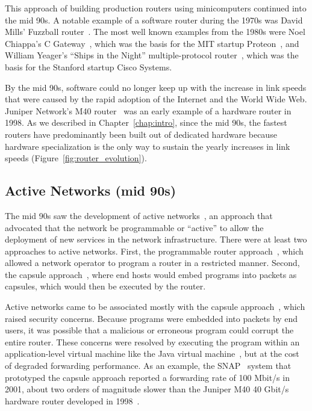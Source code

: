 This approach of building production routers using minicomputers continued into
the mid 90s.  A notable example of a software router during the 1970s was David
Mills' Fuzzball router~\cite{fuzzball}. The most well known examples from the
1980s were Noel Chiappa's C Gateway~\cite{cgw}, which was the basis for the MIT
startup Proteon~\cite{proteon}, and William Yeager's ``Ships in the Night''
multiple-protocol router~\cite{ships}, which was the basis for the Stanford
startup Cisco Systems.

By the mid 90s, software could no longer keep up with the increase in link
speeds that were caused by the rapid adoption of the Internet and the World
Wide Web. Juniper Network's M40 router~\cite{m40} was an early example
of a hardware router in 1998.  As we described in Chapter~\ref{chap:intro},
since the mid 90s, the fastest routers have predominantly been built out of
dedicated hardware because hardware specialization is the only way to sustain
the yearly increases in link speeds (Figure~\ref{fig:router_evolution}).

\subsection{Active Networks (mid 90s)}
The mid 90s saw the development of active networks~\cite{ants, switchware}, an
approach that advocated that the network be programmable or ``active'' to allow
the deployment of new services in the network infrastructure. There were at
least two approaches to active networks. First, the programmable router
approach~\cite{switchware}, which allowed a network operator to program a
router in a restricted manner. Second, the capsule approach~\cite{ants, wetherall_thesis, anet_retrospective}, where
end hosts would embed programs into packets as capsules, which would then be
executed by the router.

Active networks came to be associated mostly with the capsule
approach~\cite{sdn_history}, which raised security concerns. Because programs
were embedded into packets by end users, it was possible that a malicious or
erroneous program could corrupt the entire router. These concerns were resolved
by executing the program within an application-level virtual machine like the
Java virtual machine~\cite{ants, wetherall_thesis, anet_retrospective}, but at the cost of degraded forwarding
performance. As an example, the SNAP~\cite{snap_active_packets} system that
prototyped the capsule approach reported a forwarding rate of 100 Mbit/s in 2001,
about two orders of magnitude slower than the Juniper M40 40 Gbit/s
hardware router developed in 1998~\cite{m40}.

